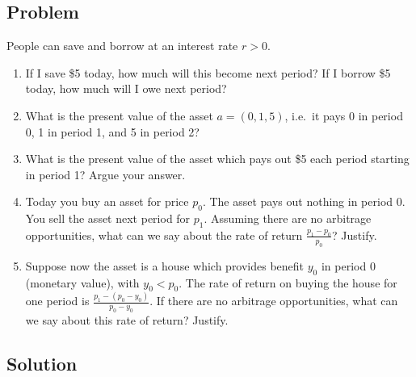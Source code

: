 \documentclass[12pt]{article}
\begin{document}
\subsection*{Problem}
People can save and borrow at an interest rate \(r>0\).
\begin{enumerate}[label=(\alph*), leftmargin=*]
\item If I save \$5 today, how much will this become next period? If I borrow \$5 today, how much will I owe next period?
\item What is the present value of the asset \(a=(0,1,5)\), i.e.\ it pays 0 in period 0, 1 in period 1, and 5 in period 2?
\item What is the present value of the asset which pays out \$5 each period starting in period 1? Argue your answer.
\item Today you buy an asset for price \(p_0\). The asset pays out nothing in period 0. You sell the asset next period for \(p_1\).
Assuming there are no arbitrage opportunities, what can we say about the rate of return \(\frac{p_1-p_0}{p_0}\)? Justify.
\item Suppose now the asset is a house which provides benefit \(y_0\) in period 0 (monetary value), with \(y_0<p_0\).
The rate of return on buying the house for one period is \(\frac{p_1-(p_0-y_0)}{p_0-y_0}\).
If there are no arbitrage opportunities, what can we say about this rate of return? Justify.
\end{enumerate}

\subsection*{Solution}
\end{document}
